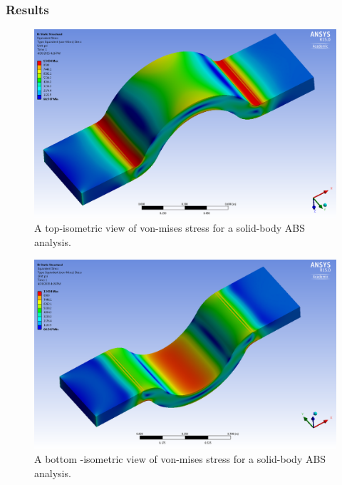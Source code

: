 \clearpage

\subsubsection{Results}


\begin{figure}[htp]
\centering
\includegraphics[width=1\textwidth]{./figures/fea/fea-solid-vms-top}
\caption{A top-isometric view of von-mises stress for a solid-body ABS analysis.}
\label{fig:fea-solid-vms-top}
\end{figure}

\begin{figure}[htp]
\centering
\includegraphics[width=1\textwidth]{./figures/fea/fea-solid-vms-bottom}
\caption{A bottom -isometric view of von-mises stress for a solid-body ABS analysis.}
\label{fig:fea-solid-vms-bottom}
\end{figure}

